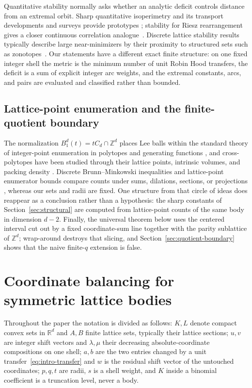 \documentclass[pdflatex,sn-mathphys-num]{sn-jnl}
\theoremstyle{thmstyleone}
\theoremstyle{thmstylethree}
\theoremstyle{thmstyletwo}
\newcommand{\Z}{\mathbb Z}
\newcommand{\R}{\mathbb R}
\begin{document}
Quantitative stability normally asks whether an analytic deficit controls
distance from an extremal orbit.  Sharp quantitative isoperimetry and its
transport developments and surveys provide prototypes
\cite{FuscoMaggiPratelli08,FigalliMaggiPratelli10,Fusco15};
stability for Riesz rearrangement gives a closer continuous correlation
analogue~\cite{CarlenMaggi17}.  Discrete lattice stability results typically
describe large near-minimizers by their proximity to structured sets such as
zonotopes~\cite{BarberErdeKeevashRoberts23}.  Our statements have a
different exact finite structure: on one fixed integer shell the metric is
the minimum number of unit Robin Hood transfers, the deficit is a sum of
explicit integer arc weights, and the extremal constants, arcs, and pairs
are evaluated and classified rather than bounded.

\subsection{Lattice-point enumeration and the finite-quotient boundary}

The normalization $B_1^d(t)=tC_d\cap\Z^d$ places Lee balls within the standard
theory of integer-point enumeration in polytopes and generating functions
\cite{BeckRobins15,Barvinok08}, and cross-polytopes have been studied through
their lattice points, intrinsic volumes, and packing density
\cite{BetkeHenk93,FejesTothFodorVigh15}.  Discrete Brunn--Minkowski
inequalities and lattice-point enumerator bounds compare counts under sums,
dilations, sections, or projections
\cite{GardnerGronchi01,IglesiasYepesZvavitch20,FreyerHenk22}, whereas our
sets and radii are fixed.  One structure from that circle of ideas does
reappear as a conclusion rather than a hypothesis: the sharp constants of
Section~\ref{sec:structural} are computed from lattice-point counts of the
same body in dimension $d-2$.  Finally, the universal theorem below uses the centered
interval cut out by a fixed coordinate-sum line together with the parity
sublattice of $\Z^d$; wrap-around destroys that slicing, and
Section~\ref{sec:quotient-boundary} shows that the naive finite-$q$
extension is false.


\section{Coordinate balancing for symmetric lattice bodies}
\label{sec:universal}

Throughout the paper the notation is divided as follows: $K,L$ denote
compact convex sets in $\R^d$ and $A,B$ finite lattice sets, typically their
lattice sections; $u,v$ are integer shift vectors and $\lambda,\mu$ their
decreasing absolute-coordinate compositions on one shell; $a,b$ are the two
entries changed by a unit transfer~\eqref{eq:intro-transfer} and $w$ is the
residual shift vector of the untouched coordinates; $p,q,t$ are radii, $s$
is a shell weight, and $K$ inside a binomial coefficient is a truncation
level, never a body.
\end{document}
